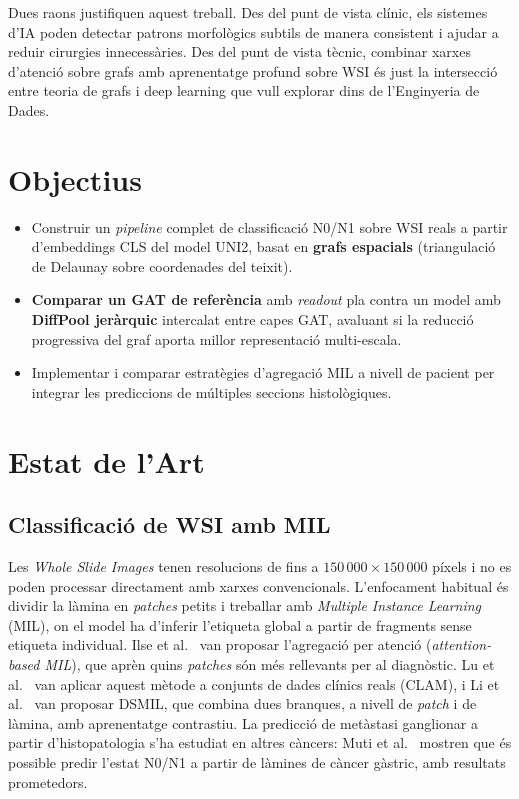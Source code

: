 \documentclass[10pt,a4paper,twocolumn,twoside]{article}
\begin{document}
Dues raons justifiquen aquest treball. Des del punt de vista clínic, els sistemes d'IA poden
detectar patrons morfològics subtils de manera consistent i ajudar a reduir cirurgies
innecessàries. Des del punt de vista tècnic, combinar xarxes d'atenció sobre grafs amb
aprenentatge profund sobre WSI és just la intersecció entre teoria de grafs i deep learning
que vull explorar dins de l'Enginyeria de Dades.

\section{Objectius}

\begin{itemize}
    \item Construir un \textit{pipeline} complet de classificació N0/N1 sobre WSI reals a partir
    d'embeddings CLS del model UNI2, basat en \textbf{grafs espacials} (triangulació de Delaunay
    sobre coordenades del teixit).
    \item \textbf{Comparar un GAT de referència} amb \textit{readout} pla contra un model amb
    \textbf{DiffPool jeràrquic} intercalat entre capes GAT, avaluant si la reducció
    progressiva del graf aporta millor representació multi-escala.
    \item Implementar i comparar estratègies d'agregació MIL a nivell de pacient per integrar
    les prediccions de múltiples seccions histològiques.
\end{itemize}

\section{Estat de l'Art}

\subsection{Classificació de WSI amb MIL}

Les \textit{Whole Slide Images} tenen resolucions de fins a $150\,000 \times 150\,000$
píxels i no es poden processar directament amb xarxes convencionals. L'enfocament habitual
és dividir la làmina en \textit{patches} petits i treballar amb \textit{Multiple Instance
Learning} (MIL), on el model ha d'inferir l'etiqueta global a partir de fragments sense
etiqueta individual. Ilse et al.~\cite{ilse2018attentionbaseddeepmultipleinstance} van
proposar l'agregació per atenció (\textit{attention-based MIL}), que aprèn quins
\textit{patches} són més rellevants per al diagnòstic. Lu et al.~\cite{lu2020dataefficientweaklysupervised}
van aplicar aquest mètode a conjunts de dades clínics reals (CLAM), i Li et
al.~\cite{li2021dualstreammultipleinstancelearning} van proposar DSMIL, que combina dues
branques, a nivell de \textit{patch} i de làmina, amb aprenentatge contrastiu. La
predicció de metàstasi ganglionar a partir d'histopatologia s'ha estudiat en altres càncers:
Muti et al.~\cite{muti2023deep} mostren que és possible predir l'estat N0/N1 a partir de
làmines de càncer gàstric, amb resultats prometedors.
\end{document}
